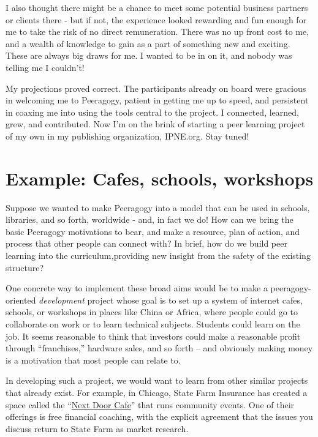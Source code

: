 I also thought there might be a chance to meet some potential business
partners or clients there - but if not, the experience looked rewarding
and fun enough for me to take the risk of no direct remuneration. There
was no up front cost to me, and a wealth of knowledge to gain as a part
of something new and exciting. These are always big draws for me. I
wanted to be in on it, and nobody was telling me I couldn't!

My projections proved correct. The participants already on board were
gracious in welcoming me to Peeragogy, patient in getting me up to
speed, and persistent in coaxing me into using the tools central to the
project. I connected, learned, grew, and contributed. Now I'm on the
brink of starting a peer learning project of my own in my publishing
organization, IPNE.org. Stay tuned!

\section*{Example: Cafes, schools, workshops}

Suppose we wanted to make Peeragogy into a model that can be used in
schools, libraries, and so forth, worldwide - and, in fact we do! How
can we bring the basic Peeragogy motivations to bear, and make a
resource, plan of action, and process that other people can connect
with? In brief, how do we build peer learning into the
curriculum\emph{,}providing new insight from the safety of the existing
structure?

One concrete way to implement these broad aims would be to make a
peeragogy-oriented \emph{development} project whose goal is to set up a
system of internet cafes, schools, or workshops in places like China or
Africa, where people could go to collaborate on work or to learn
technical subjects. Students could learn on the job. It seems reasonable
to think that investors could make a reasonable profit through
``franchises,'' hardware sales, and so forth -- and obviously making
money is a motivation that most people can relate to.

In developing such a project, we would want to learn from other similar
projects that already exist. For example, in Chicago, State Farm
Insurance has created a space called the
``\href{https://www.nextdoorchi.com/}{Next Door Cafe}'' that runs
community events. One of their offerings is free financial coaching,
with the explicit agreement that the issues you discuss return to State
Farm as market research.

